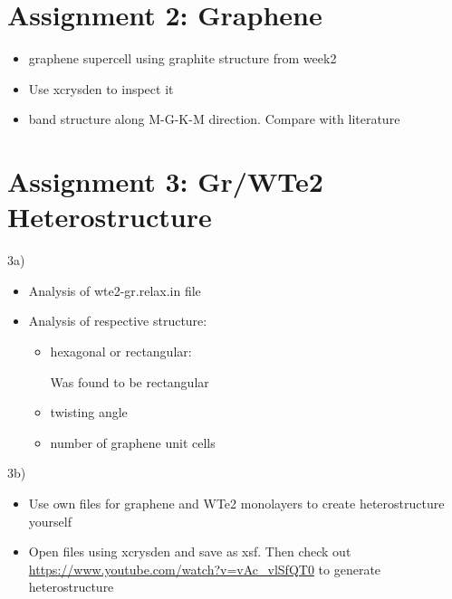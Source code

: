 \documentclass[10pt,a4paper]{labreport}
\begin{document}
\newpage
\section{Assignment 2: Graphene}
\begin{itemize}
  \item graphene supercell using graphite structure from week2
  \item Use xcrysden to inspect it
  \item band structure along M-G-K-M direction. Compare with literature 
\end{itemize}


\section{Assignment 3: Gr/WTe2 Heterostructure}
3a)
\begin{itemize}
  \item Analysis of wte2-gr.relax.in file
  \item Analysis of respective structure:
  \begin{itemize}
    \item hexagonal or rectangular: 
    
    Was found to be rectangular 
    \item twisting angle
    \item number of graphene unit cells
  \end{itemize}
\end{itemize}

3b)
\begin{itemize}
  \item Use own files for graphene and WTe2 monolayers to create heterostructure yourself
  \item Open files using xcrysden and save as xsf. Then check out \url{https://www.youtube.com/watch?v=vAc_vlSfQT0} to generate heterostructure 
\end{itemize}



\newpage

%   
\end{document}
